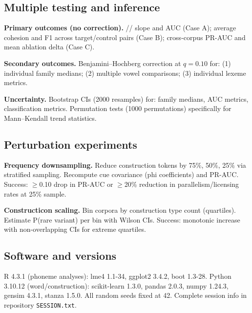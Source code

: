 \documentclass[12pt]{article}
\begin{document}
\subsection{Multiple testing and inference}

\textbf{Primary outcomes (no correction).} // slope and AUC (Case A); average cohesion and F1 across target/control pairs (Case B); cross-corpus PR-AUC and mean ablation delta (Case C).

\textbf{Secondary outcomes.} Benjamini--Hochberg correction at $q = 0.10$ for: (1) individual family medians; (2) multiple vowel comparisons; (3) individual lexeme metrics.

\textbf{Uncertainty.} Bootstrap CIs (2000 resamples) for: family medians, AUC metrics, classification metrics. Permutation tests (1000 permutations) specifically for Mann--Kendall trend statistics.

\subsection{Perturbation experiments}

\textbf{Frequency downsampling.} Reduce construction tokens by {75\%, 50\%, 25\%} via stratified sampling. Recompute cue covariance (phi coefficients) and PR-AUC. Success: $\geq$0.10 drop in PR-AUC or $\geq$20\% reduction in parallelism/licensing rates at 25\% sample.

\textbf{Constructicon scaling.} Bin corpora by construction type count (quartiles). Estimate P(rare variant) per bin with Wilson CIs. Success: monotonic increase with non-overlapping CIs for extreme quartiles.

\subsection{Software and versions}

R 4.3.1 (phoneme analyses): lme4 1.1-34, ggplot2 3.4.2, boot 1.3-28. Python 3.10.12 (word/construction): scikit-learn 1.3.0, pandas 2.0.3, numpy 1.24.3, gensim 4.3.1, stanza 1.5.0. All random seeds fixed at 42. Complete session info in repository \texttt{SESSION.txt}.

\clearpage


\end{document}
